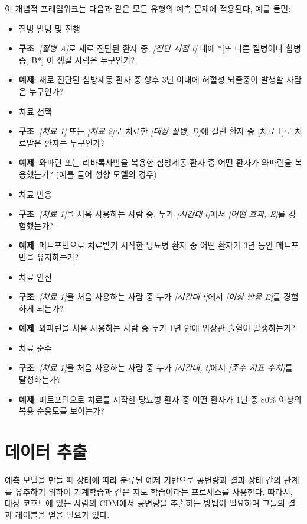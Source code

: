 \documentclass[10.5pt]{book}
\providecommand{\tightlist}{%
  \setlength{\itemsep}{0pt}\setlength{\parskip}{0pt}}
\theoremstyle{definition}
\theoremstyle{definition}
\theoremstyle{definition}
\theoremstyle{remark}
\begin{document}
이 개념적 프레임워크는 다음과 같은 모든 유형의 예측 문제에 적용된다,
예를 들면:

\begin{itemize}
\tightlist
\item
  질병 발병 및 진행
\item
  \textbf{구조}: \emph{{[}질병 A{]}}로 새로 진단된 환자 중,
  \emph{{[}진단 시점 t{]}} 내에 *{[}또 다른 질병이나 합병증, B*{]} 이
  생길 사람은 누구인가?
\item
  \textbf{예제}: 새로 진단된 심방세동 환자 중 향후 3년 이내에 허혈성
  뇌졸중이 발생할 사람은 누구인가?
\item
  치료 선택
\item
  \textbf{구조}: \emph{{[}치료 1{]}} 또는 \emph{{[}치료 2{]}}로 치료한
  \emph{{[}대상 질병, D{]}}에 걸린 환자 중 {[}치료 1{]}로 치료받은
  환자는 누구인가?
\item
  \textbf{예제}: 와파린 또는 리바록사반을 복용한 심방세동 환자 중 어떤
  환자가 와파린을 복용했는가? (예를 들어 성향 모델의 경우)
\item
  치료 반응
\item
  \textbf{구조}: \emph{{[}치료 1{]}}을 처음 사용하는 사람 중, 누가
  \emph{{[}시간대 t{]}}에서 \emph{{[}어떤 효과, E{]}}를 경험했는가?
\item
  \textbf{예제}: 메트포민으로 치료받기 시작한 당뇨병 환자 중 어떤 환자가
  3년 동안 메트포민을 유지하는가?
\item
  치료 안전
\item
  \textbf{구조}: \emph{{[}치료 1{]}}을 처음 사용하는 사람 중 누가
  \emph{{[}시간대 t{]}}에서 \emph{{[}이상 반응 E{]}}를 경험하게 되는가?
\item
  \textbf{예제}: 와파린을 처음 사용하는 사람 중 누가 1년 안에 위장관
  출혈이 발생하는가?
\item
  치료 준수
\item
  \textbf{구조}: \emph{{[}치료 1{]}}을 처음 사용하는 사람 중 누가
  \emph{{[}시간대, t{]}}에서 \emph{{[}준수 지표 수치{]}}를 달성하는가?
\item
  \textbf{예제}: 메트포민으로 치료를 시작한 당뇨병 환자 중 어떤 환자가
  1년 중 80\% 이상의 복용 순응도를 보이는가?
\end{itemize}

\section{데이터 추출}\label{--1}

예측 모델을 만들 때 상태에 따라 분류된 예제 기반으로 공변량과 결과 상태
간의 관계를 유추하기 위하여 기계학습과 같은 지도 학습이라는 프로세스를
사용한다.  따라서, 대상 코호트에 있는 사람의
CDM에서 공변량을 추출하는 방법이 필요하며 그들의 결과 레이블을 얻을
필요가 있다.
\end{document}
